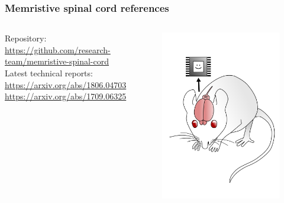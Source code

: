 \documentclass[12pt, aspectratio=169]{beamer}
\begin{document}
\begin{frame}
  \frametitle{Memristive spinal cord references}
\begin{columns}[c]

Repository:\\
\url{https://github.com/research-team/memristive-spinal-cord}\\

Latest technical reports:\\
\url{https://arxiv.org/abs/1806.04703}
\url{https://arxiv.org/abs/1709.06325}

\begin{figure}
\includegraphics[width=1.0\linewidth]{mousebrainpink}
\end{figure}
\end{columns}
\end{frame}
\end{document}
